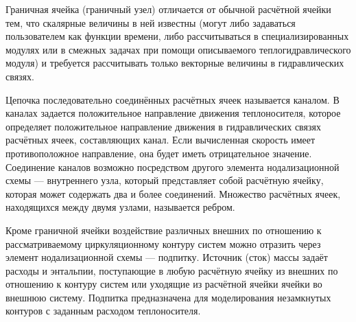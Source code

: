 Граничная ячейка (граничный узел) отличается от обычной расчётной ячейки тем, что скалярные величины в ней известны (могут либо задаваться пользователем как функции времени, либо рассчитываться в специализированных модулях или в смежных задачах при помощи описываемого теплогидравлического модуля) и требуется рассчитывать только векторные величины в гидравлических связях.

Цепочка последовательно соединённых расчётных ячеек называется каналом. В каналах задается положительное направление движения теплоносителя, которое определяет положительное направление движения в гидравлических связях расчётных ячеек, составляющих канал. Если вычисленная скорость имеет противоположное направление, она будет иметь отрицательное значение. 
Соединение каналов возможно посредством другого элемента нодализационной схемы --- внутреннего узла, который представляет собой расчётную ячейку, которая может содержать два и более соединений. Множество расчётных ячеек, находящихся между двумя узлами, называется ребром. 

Кроме граничной ячейки воздействие различных внешних по отношению к рассматриваемому циркуляционному контуру систем можно отразить через элемент нодализационной схемы --- подпитку. Источник (сток) массы задаёт расходы и энтальпии, поступающие в любую расчётную ячейку из внешних по отношению к контуру систем или уходящие из расчётной ячейки ячейки во внешнюю систему. Подпитка предназначена для моделирования незамкнутых контуров с заданным расходом теплоносителя.
\newpage











